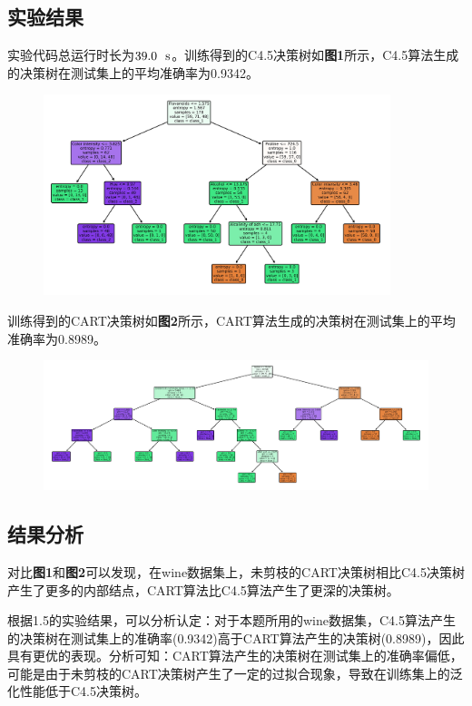 \documentclass[12pt]{article}
\begin{document}
\subsection{实验结果}
实验代码总运行时长为$39.0\ \ {\rm s}$。训练得到的C4.5决策树如\textbf{图1}所示，C4.5算法生成的决策树在测试集上的平均准确率为0.9342。
\begin{figure}[h]
	\centering
	\includegraphics[width=0.9\textwidth]{tree_C45.jpg}
\end{figure}
\par 

训练得到的CART决策树如\textbf{图2}所示，CART算法生成的决策树在测试集上的平均准确率为0.8989。

\begin{figure}[h]
	\centering
	\includegraphics[width=1\textwidth]{tree_CART.jpg}
\end{figure}
\par 


\vbox{}

\subsection{结果分析}
对比\textbf{图1}和\textbf{图2}可以发现，在wine数据集上，未剪枝的CART决策树相比C4.5决策树产生了更多的内部结点，CART算法比C4.5算法产生了更深的决策树。\par 
根据1.5的实验结果，可以分析认定：对于本题所用的wine数据集，C4.5算法产生的决策树在测试集上的准确率(0.9342)高于CART算法产生的决策树(0.8989)，因此具有更优的表现。分析可知：CART算法产生的决策树在测试集上的准确率偏低，可能是由于未剪枝的CART决策树产生了一定的过拟合现象，导致在训练集上的泛化性能低于C4.5决策树。
\vbox{}
\end{document}

